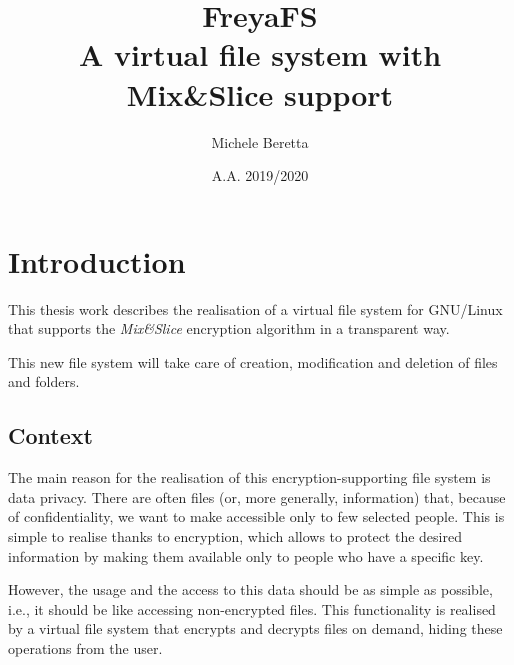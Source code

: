 \documentclass[a4paper,12pt,twoside,openright]{report}
\title{%
  \Huge FreyaFS \\
  \Large A virtual file system with Mix\&Slice support
}
\author{Michele Beretta}
\date{A.A. 2019/2020}
\begin{document}
  \thispagestyle{plain}  

  \clearpage
  \maketitle
  
  \clearpage
  \thispagestyle{plain}
  \mbox{}
  
  \clearpage
  \tableofcontents

  \clearpage
  \thispagestyle{plain}
  \mbox{}

  \clearpage
  

  \chapter{Introduction}
  \thispagestyle{fancy}
  

  This thesis work describes the realisation of a virtual file system for GNU/Linux that supports
  the \textit{Mix\&Slice} encryption algorithm in a transparent way.

  This new file system will take care of creation, modification and deletion of files and folders.

  \section{Context}

  The main reason for the realisation of this encryption-supporting file system is data privacy.
  There are often files (or, more generally, information) that, because of confidentiality,
  we want to make accessible only to few selected people.
  This is simple to realise thanks to encryption, which allows to protect the desired information by making them
  available only to people who have a specific key.

  However, the usage and the access to this data should be as simple as possible, i.e.,
  it should be like accessing non-encrypted files.
  This functionality is realised by a virtual file system that encrypts and decrypts files
  on demand, hiding these operations from the user.
\end{document}
